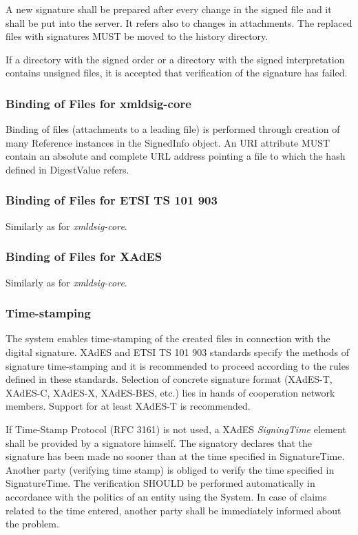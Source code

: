 \documentclass[a4paper]{article}
\begin{document}
A new signature shall be prepared after every change in the signed file and it shall be put 
into the server. It refers also to changes in attachments. The replaced files with signatures 
MUST be moved to the history directory.

If a directory with the signed order or a directory with the signed interpretation contains 
unsigned files, it is accepted that verification of the signature has failed.

\subsubsection{Binding of Files for xmldsig-core}

Binding of files (attachments to a leading file) is performed through creation of many 
Reference instances in the SignedInfo object. An URI attribute MUST contain an absolute and 
complete URL address pointing a file to which the hash defined in DigestValue refers.

\subsubsection{Binding of Files for ETSI TS 101 903}

Similarly as for \emph{xmldsig-core}.

\subsubsection{Binding of Files for XAdES}

Similarly as for \emph{xmldsig-core}.

\subsubsection{Time-stamping}

The system enables time-stamping of the created files in connection with the digital signature.
XAdES and ETSI TS 101 903 standards specify the methods of signature time-stamping and it 
is recommended to proceed according to the rules defined in these standards. Selection of
concrete signature format (XAdES-T, XAdES-C, XAdES-X, XAdES-BES, etc.) lies in hands of 
cooperation network members. Support for at least XAdES-T is recommended. 

If Time-Stamp Protocol (RFC 3161) is not used, a XAdES \emph{SigningTime} element 
shall be provided by a signatore himself. The signatory 
declares that the signature has been made no sooner than at the time specified in SignatureTime. 
Another party (verifying time stamp) is obliged to verify the time specified in SignatureTime. 
The verification SHOULD be performed automatically in accordance with the politics of an 
entity using the System. In case of claims related to the time entered, another party shall 
be immediately informed about the problem.
\end{document}
